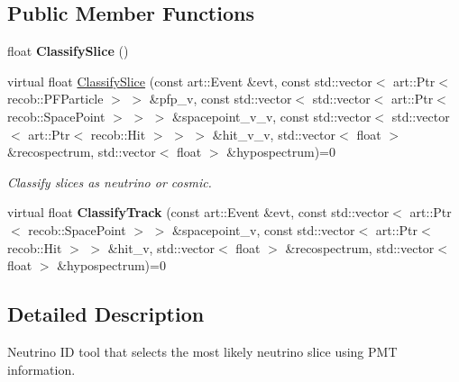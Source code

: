 \subsection*{Public Member Functions}
\begin{DoxyCompactItemize}
\item 
\hypertarget{classflashmatch_1_1FlashMatchingToolBase_a8133f8cf2289dd17d0a05ba2a3c02da4}{float {\bfseries Classify\-Slice} ()}\label{classflashmatch_1_1FlashMatchingToolBase_a8133f8cf2289dd17d0a05ba2a3c02da4}

\item 
virtual float \hyperlink{classflashmatch_1_1FlashMatchingToolBase_a79d9ba4fe96a0b887631c8ae62f7cbcd}{Classify\-Slice} (const art\-::\-Event \&evt, const std\-::vector$<$ art\-::\-Ptr$<$ recob\-::\-P\-F\-Particle $>$ $>$ \&pfp\-\_\-v, const std\-::vector$<$ std\-::vector$<$ art\-::\-Ptr$<$ recob\-::\-Space\-Point $>$ $>$ $>$ \&spacepoint\-\_\-v\-\_\-v, const std\-::vector$<$ std\-::vector$<$ art\-::\-Ptr$<$ recob\-::\-Hit $>$ $>$ $>$ \&hit\-\_\-v\-\_\-v, std\-::vector$<$ float $>$ \&recospectrum, std\-::vector$<$ float $>$ \&hypospectrum)=0
\begin{DoxyCompactList}\small\item\em Classify slices as neutrino or cosmic. \end{DoxyCompactList}\item 
\hypertarget{classflashmatch_1_1FlashMatchingToolBase_a3fc65b46bbcebf7d47ead748ef6f5b01}{virtual float {\bfseries Classify\-Track} (const art\-::\-Event \&evt, const std\-::vector$<$ art\-::\-Ptr$<$ recob\-::\-Space\-Point $>$ $>$ \&spacepoint\-\_\-v, const std\-::vector$<$ art\-::\-Ptr$<$ recob\-::\-Hit $>$ $>$ \&hit\-\_\-v, std\-::vector$<$ float $>$ \&recospectrum, std\-::vector$<$ float $>$ \&hypospectrum)=0}\label{classflashmatch_1_1FlashMatchingToolBase_a3fc65b46bbcebf7d47ead748ef6f5b01}

\end{DoxyCompactItemize}


\subsection{Detailed Description}
Neutrino I\-D tool that selects the most likely neutrino slice using P\-M\-T information. 

